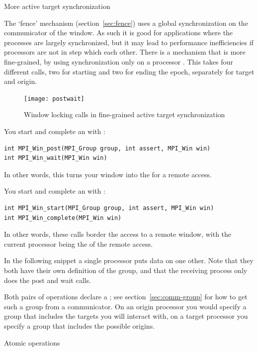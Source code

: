  {More active target synchronization}
\label{sec:ref:post-wait}

The `fence' mechanism (section~\ref{sec:fence}) uses a global synchronization on the
communicator of the window. As such it is good for applications where
the processes are largely synchronized, but it may 
lead to performance inefficiencies if processors are not in step which each other. 
There is a mechanism that is more fine-grained, by using synchronization only 
on a processor . This takes four different calls, two for starting
and two for ending the epoch, separately for target and origin.
\begin{figure}[ht]
  \texttt{[image: postwait]}
  \caption{Window locking calls in fine-grained active target synchronization}
  \label{fig:postwait}
\end{figure}

You start and complete an  with%
:
\begin{lstlisting}
int MPI_Win_post(MPI_Group group, int assert, MPI_Win win)
int MPI_Win_wait(MPI_Win win)
\end{lstlisting}
In other words, this turns your window into the  for a remote access.

You start and complete an  with%
:
\begin{lstlisting}
int MPI_Win_start(MPI_Group group, int assert, MPI_Win win)
int MPI_Win_complete(MPI_Win win)
\end{lstlisting}
In other words, these calls border the access to a remote window, with the current processor
being the  of the remote access.

In the following snippet a single processor puts data on one
other. Note that they both have their own definition of the group, and
that the receiving process only does the post and wait calls.
%

Both pairs of operations declare a
; see section~\ref{sec:comm-group}
for how to get such a group from a communicator.
On an origin processor you would specify a group that includes the targets
you will interact with, on a target processor you specify a group
that includes the possible origins.

 {Atomic operations}
\label{sec:mpi-atomic}

